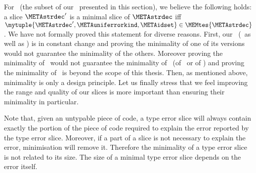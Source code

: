 \documentclass{jfp1}
\begin{document}
For \CORETES\ (the subset of our \TES\ presented in this section), we
believe the following holds:
%
a slice $\METAstrdec'$ is a minimal slice of $\METAstrdec$ iff
$\mytuple{\METAstrdec',\METAuniferrorkind,\METAidset}\in\MEMtes{\METAstrdec}$.
%
%
We have not formally proved this statement for diverse reasons.
First, our \TES\ (\FORMTES\ as well as \IMPLTES) is in constant change
and proving the minimality of one of its versions would not guarantee
the minimality of the others.  Moreover proving the minimality of
\CORETES\ would not guarantee the minimality of \TES\ (of \FORMTES\ or
of \IMPLTES) and proving the minimality of \TES\ is beyond the scope
of this thesis.
%
Then, as mentioned above, minimality is only a design principle.  Let
us finally stress that we feel improving the range and quality of our
slices is more important than ensuring their minimality in particular.

Note that, given an untypable piece of code, a type error slice will
always contain exactly the portion of the piece of code required to
explain the error reported by the type error slice.  Moreover, if a
part of a slice is not necessary to explain the error, minimisation
will remove it.  Therefore the minimality of a type error slice is not
related to its size.  The size of a minimal type error slice depends
on the error itself.


\end{document}
